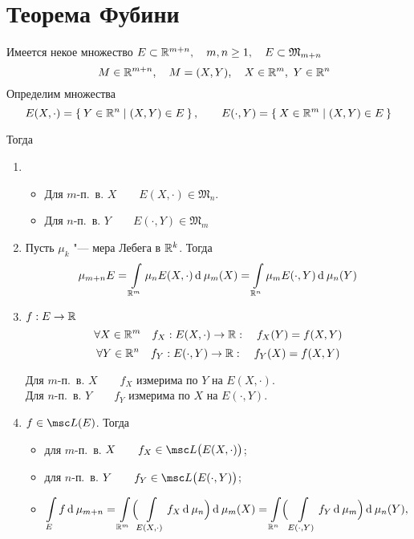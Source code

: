 \section{Теорема Фубини}

\begin{theorem}
	Имеется некое множество $ E \subset \mathbb{R}^{m + n}, \quad m, n \ge 1, \quad E \subset \mathfrak M_{m + n} $
	$$ \quad M \in \mathbb{R}^{m + n}, \quad M = (X, Y), \quad X \in \mathbb{R}^m, ~ Y \in \mathbb{R}^n $$
	Определим множества
	$$ E (X, \cdot) = \Set{ Y \in \ensuremath{\mathbb{R}}^n \mid (X, Y) \in E}, \qquad E(\cdot, Y) = \Set{X \in \ensuremath{\mathbb{R}}^m \mid (X, Y) \in E} $$

	Тогда
	\begin{enumerate}
		\item
			\begin{itemize}
			\item Для $ m $-п.~в. $ X \qquad E(X, \cdot) \in \mathfrak M_n $.
			\item Для $ n $-п.~в. $ Y \qquad E(\cdot, Y) \in \mathfrak M_m $
		\end{itemize}
		\item Пусть $ \mu_k $ "--- мера Лебега в $ \mathbb{R}^k $. Тогда
			$$ \mu_{m + n} E = \int\limits_{\mathbb{R}^m} \mu_n E(X, \cdot) \operatorname{d}^{} \mu_m(X) = \int\limits_{\mathbb{R}^n} \mu_m E(\cdot, Y) \operatorname{d}^{} \mu_n(Y) $$
		\item $ f : E \to \mathbb{R} $
			$$ \forall X \in \mathbb{R}^m \quad f_X : E(X, \cdot) \to \mathbb{R} : \quad f_X(Y) = f(X, Y) $$
			$$ \forall Y \in \mathbb{R}^n \quad f_Y : E(\cdot, Y) \to \mathbb{R} : \quad f_Y(X) = f(X, Y) $$

			Для $ m $-п.~в. $ X \qquad f_X $ измерима по $ Y $ на $ E(X, \cdot) $. \\
			Для $ n $-п.~в. $ Y \qquad f_Y $ измерима по $ X $ на $ E(\cdot, Y) $.

		\item $ f \in \msc L(E) $. Тогда
			\begin{itemize}
				\item для $ m $-п.~в. $ X \qquad f_X \in \msc L \bigl( E(X, \cdot) \bigr) $;
				\item для $ n $-п.~в. $ Y \qquad f_Y \in \msc L \bigl( E(\cdot, Y) \bigr) $;
				\item
					$$ \int\limits_E f \operatorname{d}^{} \mu_{m + n} = \int\limits_{\mathbb{R}^m} \Bigl( \int\limits_{E(X, \cdot)} f_X \operatorname{d}^{} \mu_n \Bigr) \operatorname{d}^{} \mu_m(X) = \int\limits_{\mathbb{R}^n} \Bigr(\int\limits_{E(\cdot, Y)} f_Y \operatorname{d}^{} \mu_m \Bigr) \operatorname{d}^{} \mu_n(Y), $$
			\end{itemize}
	\end{enumerate}
\end{theorem}

